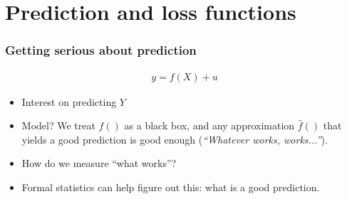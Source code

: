 \documentclass[
  shownotes,
  xcolor={svgnames},
  hyperref={colorlinks,citecolor=DarkBlue,linkcolor=andesred,urlcolor=DarkBlue}
  , aspectratio=169]{beamer}
\begin{document}
\section{Prediction and loss functions}
\begin{frame}
\frametitle{Getting serious about prediction}


\begin{align}
y=f(X)+u
\end{align}

\begin{itemize}
  \item Interest on predicting $Y$
  \medskip
  \item Model? We  treat $f()$ as a black box, and any approximation $\hat{f}()$ that yields a good prediction is good enough ({\it ``Whatever works, works...''}).
  \medskip
  \item How do we measure ``what works''?
  \pause
  \medskip
  \item Formal statistics can help  figure out this: what is a good prediction.

\end{itemize}

\end{frame}
\end{document}
